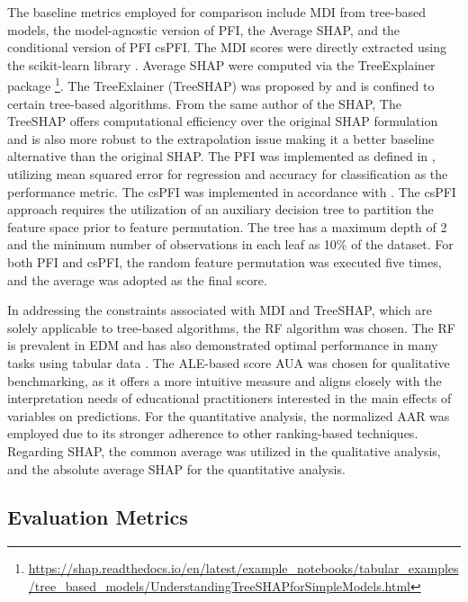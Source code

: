The baseline metrics employed for comparison include  \gls{MDI} from tree-based models, the model-agnostic version of \gls{PFI}, the Average \gls{SHAP}, and the conditional version of PFI \gls{csPFI}. The \gls{MDI} scores were directly extracted using the scikit-learn library \cite{scikit-learn}. Average \gls{SHAP} were computed via the TreeExplainer package \footnote{\url{https://shap.readthedocs.io/en/latest/example\_notebooks/tabular\_examples/tree\_based_models/UnderstandingTreeSHAPforSimpleModels.html}}. The TreeExlainer (TreeSHAP)  was proposed by \cite{Lundberg2020FromTrees.} and is confined to certain tree-based algorithms. From the same author of the \gls{SHAP}, The TreeSHAP offers computational efficiency over the original \gls{SHAP} formulation and is also more robust to the extrapolation issue making it a better baseline alternative than the original \gls{SHAP}. The \gls{PFI} was implemented as defined in \cite{Fisher2018AllSimultaneously}, utilizing mean squared error for regression and accuracy for classification as the performance metric. The \gls{csPFI} was implemented in accordance with \cite{Molnar2023Model-agnosticApproach}. The \gls{csPFI} approach requires the utilization of an auxiliary decision tree to partition the feature space prior to feature permutation. The tree has a maximum depth of 2 and the minimum number of observations in each leaf as 10\% of the dataset. For both \gls{PFI} and \gls{csPFI}, the random feature permutation was executed five times, and the average was adopted as the final score.

In addressing the constraints associated with \gls{MDI} and TreeSHAP, which are solely applicable to tree-based algorithms, the \gls{RF} algorithm was chosen. The RF is prevalent in \gls{EDM}\cite{Martinez-Abad2020EducationalAssessment} and has also demonstrated optimal performance in many tasks using tabular data \cite{Grinsztajn2022WhyData}. The \gls{ALE}-based score \gls{AUA} was chosen for qualitative benchmarking, as it offers a more intuitive measure and aligns closely with the interpretation needs of educational practitioners interested in the main effects of variables on predictions. For the quantitative analysis, the normalized \gls{AAR} was employed due to its stronger adherence to other ranking-based techniques. Regarding \gls{SHAP}, the common average was utilized in the qualitative analysis, and the absolute average \gls{SHAP} for the quantitative analysis.    

\subsection{Evaluation Metrics}


